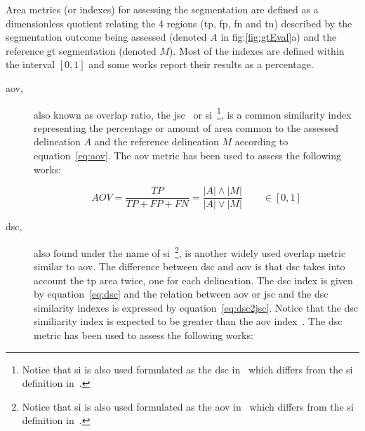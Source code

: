 \documentclass[authoryear,preprint,review,12pt]{elsarticle}
\begin{document}
\vspace{15pt}
Area metrics (or indexes) for assessing the segmentation are defined as a dimensionless quotient relating the 4 regions (\ac{tp}, \ac{fp}, \ac{fn} and \ac{tn}) described by the segmentation outcome being assessed (denoted $A$ in fig:\ref{fig:gtEval}a) and the reference \ac{gt} segmentation (denoted $M$). Most of the indexes are defined within the interval $[0,1]$ and some works report their results as a percentage.

\begin{description}

\item[\acf{aov},] also known as overlap ratio, the \ac{jsc}~\cite{Gao:2012p14336} or \ac{si}~\cite{Shan:2012p14347}\footnote{Notice that \acf{si} is also used formulated as the \acf{dsc} in~\cite{Huang:2007p6100,Huang:2005p11636} which differs from the \ac{si} definition in~\cite{Shan:2012p14347}.}, is a common similarity index representing the percentage or amount of area common to the assessed delineation $A$ and the reference delineation $M$ according to equation~\ref{eq:aov}. 
The \ac{aov} metric has been used to assess the following works: \cite{Horsch:2001p6028,Gomez:2010p14339,AlemanFlores:2007p14310,Cui:2009p14325,massich2010lesion,Shan:2012p14347,hao2012combining,Liu:2010p14328}

\begin{equation}\label{eq:aov}
AOV = \frac{TP}{TP+FP+FN}=\frac{|A| \wedge |M|}{|A| \vee |M|} \qquad \in [0,1]
\end{equation}

\item[\acf{dsc},]
also found under the name of \ac{si}~\cite{Huang:2007p6100,Huang:2005p11636}\footnote{Notice that \acf{si} is also used formulated as the \acf{aov} in~\cite{Shan:2012p14347} which differs from the \ac{si} definition in~\cite{Huang:2007p6100,Huang:2005p11636}.},
is another widely used overlap metric similar to \ac{aov}. The difference between \ac{dsc} and \ac{aov} is that \ac{dsc} takes into account the \ac{tp} area twice, one for each delineation. 
The \ac{dsc} index is given by equation~\ref{eq:dsc} and the relation between \ac{aov} or \ac{jsc} and the \ac{dsc} similarity indexes is expressed by equation~\ref{eq:dsc2jsc}. Notice that the \ac{dsc} similiarity index is expected to be greater than the \ac{aov} index~\cite{gerard2013}. The \ac{dsc} metric has been used to assess the following works:\cite{gerard2013,Huang:2007p6100,Zhang:2010p14317,Huang:2005p11636}


\end{description}
\end{document}
